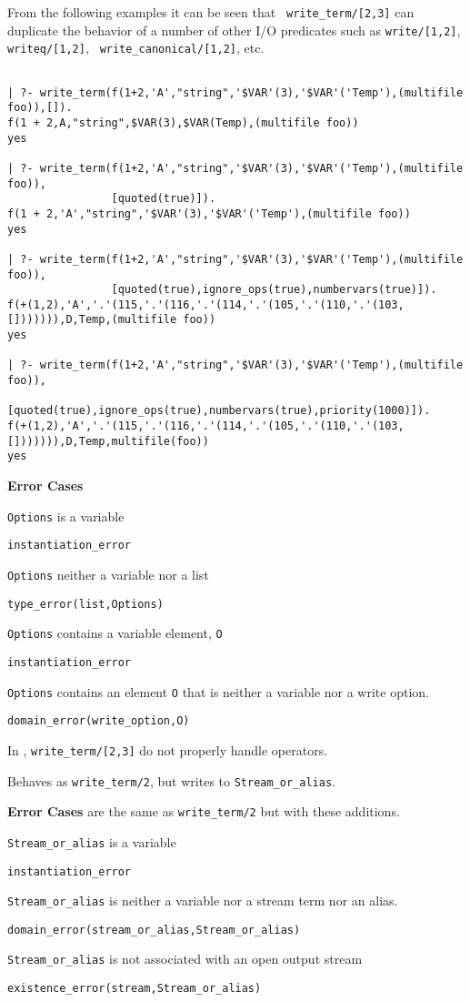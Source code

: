 \begin{description}
From the following examples it can be seen that {\tt
write\_term/[2,3]} can duplicate the behavior of a number of other
I/O predicates such as {\tt write/[1,2]}, {\tt writeq/[1,2]}, {\tt
write\_canonical/[1,2]}, etc.
{\small
\begin{verbatim}

| ?- write_term(f(1+2,'A',"string",'$VAR'(3),'$VAR'('Temp'),(multifile foo)),[]).
f(1 + 2,A,"string",$VAR(3),$VAR(Temp),(multifile foo))
yes

| ?- write_term(f(1+2,'A',"string",'$VAR'(3),'$VAR'('Temp'),(multifile foo)),
                [quoted(true)]).
f(1 + 2,'A',"string",'$VAR'(3),'$VAR'('Temp'),(multifile foo))
yes

| ?- write_term(f(1+2,'A',"string",'$VAR'(3),'$VAR'('Temp'),(multifile foo)),
                [quoted(true),ignore_ops(true),numbervars(true)]).
f(+(1,2),'A','.'(115,'.'(116,'.'(114,'.'(105,'.'(110,'.'(103,[])))))),D,Temp,(multifile foo))
yes

| ?- write_term(f(1+2,'A',"string",'$VAR'(3),'$VAR'('Temp'),(multifile foo)),
                [quoted(true),ignore_ops(true),numbervars(true),priority(1000)]).
f(+(1,2),'A','.'(115,'.'(116,'.'(114,'.'(105,'.'(110,'.'(103,[])))))),D,Temp,multifile(foo))
yes
\end{verbatim}
}

{\bf Error Cases} 
\bi
\item 	{\tt Options} is a variable
\bi
\item    {\tt instantiation\_error}
\ei
\item 	{\tt Options} neither a variable nor a list
\bi
\item    {\tt type\_error(list,Options)}
\ei
\item 	{\tt Options} contains a variable element, {\tt O}
\bi
\item    {\tt instantiation\_error}
\ei
\item 	{\tt Options} contains an element {\tt O} that is neither a variable
nor a write option.
\bi
\item    {\tt domain\_error(write\_option,O)}
\ei
\ei

\compatability In \version{}, {\tt write\_term/[2,3]} do not properly
handle operators.

% 
Behaves as {\tt write\_term/2}, but writes to {\tt Stream\_or\_alias}.

{\bf Error Cases} are the same as {\tt write\_term/2} but with these
additions.
\bi
\item 	{\tt Stream\_or\_alias} is a variable
\bi
\item {\tt instantiation\_error}
\ei
\item 	{\tt Stream\_or\_alias} is neither a variable nor a stream term nor an alias.
\bi
\item 	{\tt domain\_error(stream\_or\_alias,Stream\_or\_alias)}
\ei
\item 	{\tt Stream\_or\_alias} is not associated with an open output stream
\bi
\item 	{\tt existence\_error(stream,Stream\_or\_alias)}
\ei
\ei


\end{description}
